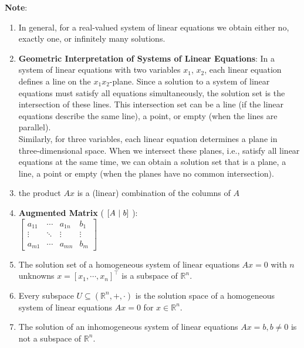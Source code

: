 \begin{enumerate}
    
    
\end{enumerate}


\vspace{0.5cm}
\textbf{Note}:
\begin{enumerate}
    \item In general, for a real-valued system of linear equations we obtain either no, exactly one, or infinitely many solutions. 
    \hfill \cite{mfml/book/mml/Deisenroth-Faisal-Ong}

    \item \textbf{Geometric Interpretation of Systems of Linear Equations}: 
    In a system of linear equations with two variables $x_1$, $x_2$, each linear equation defines a line on the $x_1x_2$-plane. Since a solution to a system of linear equations must satisfy all equations simultaneously, the solution set is the intersection of these lines. This intersection set can be a line (if the linear equations describe the same line), a point, or empty (when the lines are parallel).
    \hfill \cite{mfml/book/mml/Deisenroth-Faisal-Ong}
    \\
    Similarly, for three variables, each linear equation determines a plane in three-dimensional space. When we intersect these planes, i.e., satisfy all linear equations at the same time, we can obtain a solution set that is a plane, a line, a point or empty (when the planes have no common intersection).
    \hfill \cite{mfml/book/mml/Deisenroth-Faisal-Ong}

    \item the product $Ax$ is a (linear) combination of the columns of $A$
    \hfill \cite{mfml/book/mml/Deisenroth-Faisal-Ong}

    \item \textbf{Augmented Matrix} ( $\left[A\ |\ b\right]$ ): 
    \\[0.2cm]
    $
        \left[
        \begin{array}{ccc|c}
            a_{11} & \cdots & a_{1n} & b_{1}\\
            \vdots & \ddots & \vdots & \vdots \\
            a_{m1} & \cdots & a_{mn} & b_{m}
        \end{array}
        \right]
    $

    \item The solution set of a homogeneous system of linear equations $Ax = 0$ with $n$ unknowns $x = [x_1, \cdots , x_n]^\top$ is a subspace of $\mathbb{R}^n$.
    \hfill \cite{mfml/book/mml/Deisenroth-Faisal-Ong}

    \item Every subspace $U \subseteq (\mathbb{R}^n , +, \cdot)$ is the solution space of a homogeneous system of linear equations $Ax = 0$ for $x \in \mathbb{R}^n$.
    \hfill \cite{mfml/book/mml/Deisenroth-Faisal-Ong}

    \item The solution of an inhomogeneous system of linear equations $Ax = b, b \neq 0$ is not a subspace of $\mathbb{R}^n$.
    \hfill \cite{mfml/book/mml/Deisenroth-Faisal-Ong}

    
\end{enumerate}
